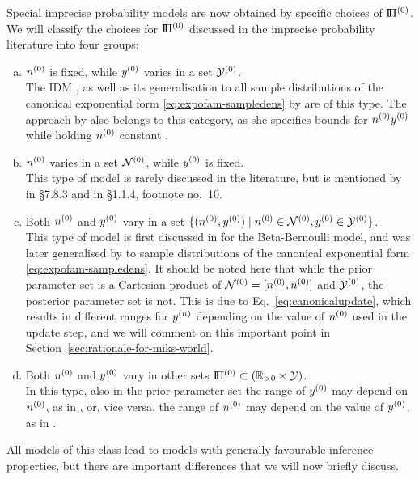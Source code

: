 Special imprecise probability models are now obtained by specific choices of $\text{I}\!\Pi^{(0)}$.
We will classify the choices for $\text{I}\!\Pi^{(0)}$ discussed in the imprecise probability literature into four groups:
\begin{enumerate}[(a)]
\item $n^{(0)}$ is fixed, while $y^{(0)}$ varies in a set $\mathcal{Y}^{(0)}$.\\
\label{enum:modeltypes-a}%
The IDM \cite{1996:walley::idm},
as well as its generalisation to all sample distributions of the canonical exponential form \eqref{eq:expofam-sampledens}
by \cite{2005:quaeghebeurcooman} are of this type.
The approach by \cite{1997:boratynska} also belongs to this category,
as she specifies bounds for $n^{(0)} y^{(0)}$ while holding $n^{(0)}$ constant \cite[see][p.~1973]{2012:benavolizaffalon}.
\item $n^{(0)}$ varies in a set $\mathcal{N}^{(0)}$, while $y^{(0)}$ is fixed.\\
\label{enum:varyn}%
This type of model is rarely discussed in the literature,
but is mentioned by \cite{1991:walley} in {\S 7.8.3} and in {\S 1.1.4}, footnote no.~10.
\item Both $n^{(0)}$ and $y^{(0)}$ vary in a set $\{ (n^{(0)}, y^{(0)}) \mid n^{(0)} \in \mathcal{N}^{(0)}, y^{(0)} \in \mathcal{Y}^{(0)} \}$.\\
\label{enum:rectangular}%
This type of model is first discussed in \cite[\S 5.4.3]{1991:walley} for the Beta-Bernoulli model,
and was later generalised by \cite{Walter2009a-long}
to sample distributions of the canonical exponential form \eqref{eq:expofam-sampledens}.
It should be noted here that while the prior parameter set is a Cartesian product of $\mathcal{N}^{(0)} = [\underline{n}^{(0)}, \overline{n}^{(0)}]$ and $\mathcal{Y}^{(0)}$,
the posterior parameter set is not.
This is due to Eq.~\eqref{eq:canonicalupdate},
which results in different ranges for $y^{(n)}$ depending on the value of $n^{(0)}$ used in the update step,
and we will comment on this important point in Section~\ref{sec:rationale-for-miks-world}.
\item Both $n^{(0)}$ and $y^{(0)}$ vary in other sets $\text{I}\!\Pi^{(0)} \subset (\mathbb{R}_{>0} \times \mathcal{Y})$.\\
\label{enum:generalset}%
In this type, also in the prior parameter set the range of $y^{(0)}$ may depend on $n^{(0)}$,
as in \cite[\S 2.3]{Walter2011a},
or, vice versa, the range of $n^{(0)}$ may depend on the value of $y^{(0)}$, as in \cite{2012:benavolizaffalon}.
\end{enumerate}

All models of this class lead to models with generally favourable inference properties,
but there are important differences that we will now briefly discuss.

